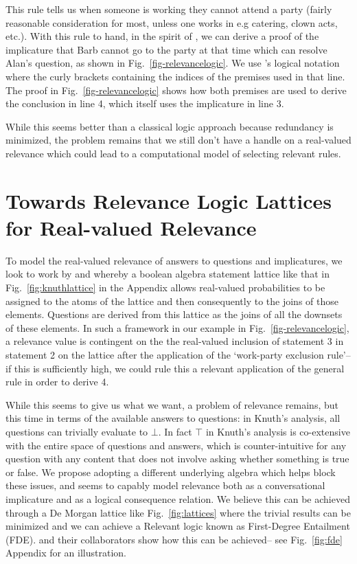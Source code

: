 \documentclass[11pt,a4paper]{article}
\theoremstyle{definition}
\begin{document}
This rule tells us when someone is working they cannot attend a party (fairly reasonable consideration for most, unless one works in e.g catering, clown acts, etc.). With this rule to hand, in the spirit of \cite{Breitholtz2014}, we can derive a proof of the implicature that Barb cannot go to the party at that time which can resolve Alan's question, as shown in Fig.~\ref{fig-relevancelogic}. We use 's logical notation where the curly brackets containing the indices of the premises used in that line. The proof in Fig.~\ref{fig-relevancelogic} shows how both premises are used to derive the conclusion in line 4, which itself uses the implicature in line 3.

While this seems better than a classical logic approach because redundancy is minimized, the problem remains that we still don't have a handle on a real-valued relevance which could lead to a computational model of selecting relevant rules.

\section{Towards Relevance Logic Lattices for Real-valued Relevance}





To model the real-valued relevance of answers to questions and implicatures, we look to work by  and \cite{HoughPurver2017Lattices} whereby a boolean algebra statement lattice like that in Fig.~\ref{fig:knuthlattice} in the Appendix allows real-valued probabilities to be assigned to the atoms of the lattice and then consequently to the joins of those elements. Questions are derived from this lattice as the joins of all the downsets of these elements. In such a framework in our example in Fig.~\ref{fig-relevancelogic}, a relevance value is contingent on the the real-valued inclusion of statement 3 in statement 2 on the lattice after the application of the `work-party exclusion rule'-- if this is sufficiently high, we could rule this a relevant application of the general rule in order to derive 4. 

While this seems to give us what we want, a problem of relevance remains, but this time in terms of the available answers to questions: in Knuth's analysis, all questions can trivially evaluate to $\bot$. In fact $\top$ in Knuth's analysis is co-extensive with the entire space of questions and answers, which is counter-intuitive for any question with any content that does not involve asking whether something is true or false. We propose adopting a different underlying algebra which helps block these issues, and seems to capably model relevance both as a conversational implicature and as a logical consequence relation.  We believe this can be achieved through a De Morgan lattice like Fig.~\ref{fig:lattices} where the trivial results can be minimized and we can achieve a Relevant logic known as First-Degree Entailment (FDE). \cite{Belnap1977} and their collaborators \cite{anderson2017entailment} show how this can be achieved-- see Fig.~\ref{fig:fde} Appendix for an illustration.
\end{document}
